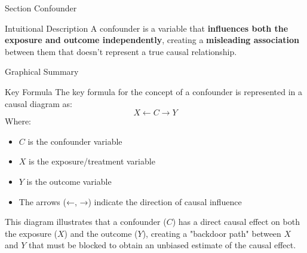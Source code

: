 
\begin{frame}{Section}
\centering
\Huge{Confounder}
\end{frame}


\begin{frame}{Intuitional Description}
A confounder is a variable that \textbf{influences both the exposure and outcome independently}, creating a \textbf{misleading association} between them that doesn't represent a true causal relationship.
\end{frame}

\begin{frame}{Graphical Summary}

\end{frame}


\begin{frame}{Key Formula}
The key formula for the concept of a confounder is represented in a causal diagram as:
$$
X ← C → Y
$$
Where:
\begin{itemize}
\item $C$ is the confounder variable
\item $X$ is the exposure/treatment variable 
\item $Y$ is the outcome variable
\item The arrows (←, →) indicate the direction of causal influence
\end{itemize}

This diagram illustrates that a confounder ($C$) has a direct causal effect on both the exposure ($X$) and the outcome ($Y$), creating a "backdoor path" between $X$ and $Y$ that must be blocked to obtain an unbiased estimate of the causal effect.

\end{frame}


